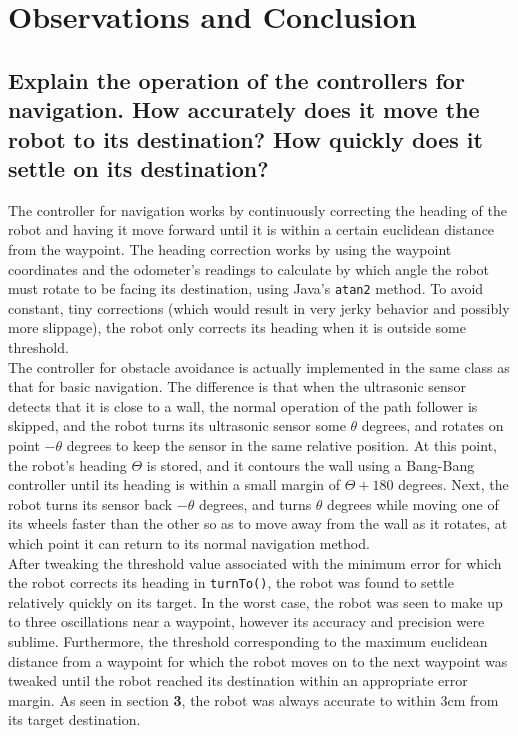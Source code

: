 \documentclass[11pt]{article}
\begin{document}
\section{Observations and Conclusion}
\subsection{Explain the operation of the controllers for navigation. How accurately does it move the
robot to its destination? How quickly does it settle on its destination?}
The controller for navigation works by continuously correcting the heading of the robot and having
it move forward until it is within a certain euclidean distance from the waypoint. The heading
correction works by using the waypoint coordinates and the odometer's
readings to calculate by which angle the robot must rotate to be facing its destination, using
Java's \texttt{atan2} method. To avoid
constant, tiny corrections (which would result in very jerky behavior and possibly more slippage),
the robot only corrects its heading when it is outside some threshold. \\
The controller for obstacle avoidance is actually implemented in the same class as that for basic
navigation. The difference is that when the ultrasonic sensor detects that it is close to a wall,
the normal operation of the path follower is skipped, and the robot turns its ultrasonic sensor some
$\theta$ degrees, and rotates on point $-\theta$ degrees to keep the sensor in the same relative
position. At this point, the robot's heading $\Theta$ is stored, and it contours the wall using a
Bang-Bang controller until its heading is within a small margin of $\Theta + 180$ degrees. Next, the
robot turns its sensor back $-\theta$ degrees, and turns $\theta$ degrees while moving one of its
wheels faster than the other so as to move away from the wall as it rotates, at which point it can
return to its normal navigation method.\\
After tweaking the threshold value associated with the minimum error for which the robot corrects
its heading in \texttt{turnTo()}, the robot was found to settle relatively quickly on its target. In
the worst case, the robot was seen to make up to three oscillations near a waypoint, however its
accuracy and precision were sublime. Furthermore, the threshold corresponding to the maximum
euclidean distance from a waypoint for which the robot moves on to the next waypoint was tweaked
until the robot reached its destination within an appropriate error margin. As seen in section
\textbf{3}, the robot was always accurate to within 3cm from its target destination.
\end{document}
